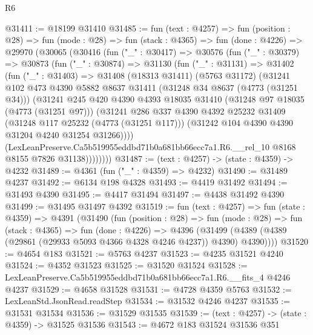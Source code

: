 \begin{lexlean}{R6}
\begin{coremodule}
@31411 := @18199 @31410
@31485 := fun (text : @4257) =>
  fun (position : @28) =>
  fun (mode : @28) =>
  fun (stack : @4365) =>
  fun (done : @4226) =>
  @29970
    (@30065
      (@30416
        (fun ("_" : @30417) =>
        @30576
          (fun ("_" : @30379) =>
          @30873
            (fun ("_" : @30874) =>
            @31130
              (fun ("_" : @31131) =>
              @31402
                (fun ("_" : @31403) =>
                @31408
                  (@18313 @31411)
                  (@5763 @31172)
                  (@31241
                    @102
                    @473
                    @4390
                    @5882
                    @8637
                    @31411
                    (@31248 @34 @8637 (@4773 (@31251 @34)))
                    (@31241
                      @245
                      @420
                      @4390
                      @4393
                      @18035
                      @31410
                      (@31248 @97 @18035 (@4773 (@31251 @97)))
                      (@31241
                        @286
                        @337
                        @4390
                        @4392
                        @25232
                        @31409
                        (@31248 @117 @25232 (@4773 (@31251 @117)))
                        (@31242 @104 @4390 @4390 @31204 @4240 @31254 @31266))))
                  (LexLeanPreserve.Ca5b519955eddbd71b0a681bb66ecc7a1.R6.__rel_10
                    @8168
                    @8155
                    @7826
                    @31138))))))))
@31487 := (text : @4257) -> (state : @4359) -> @4232
@31489 := @4361 (fun ("_" : @4359) => @4232)
@31490 := @31489 @4237
@31492 := @6134 @198 @4328
@31493 := @4419 @31492
@31494 := @31493 @4390
@31495 := @4417 @31494
@31497 := @4438 @31492 @4390
@31499 := @31495 @31497 @4392
@31519 := fun (text : @4257) =>
  fun (state : @4359) =>
  @4391
    (@31490
      (fun (position : @28) =>
      fun (mode : @28) =>
      fun (stack : @4365) =>
      fun (done : @4226) =>
      @4396 (@31499 (@4389 (@4389 (@29861 (@29933 @5093 @4366 @4328 @4246 @4237)) @4390) @4390))))
@31520 := @4654 @183
@31521 := @5763 @4237
@31523 := @4235 @31521 @4240
@31524 := @4352 @31523
@31525 := @31520 @31524
@31528 := LexLeanPreserve.Ca5b519955eddbd71b0a681bb66ecc7a1.R6.__fits_4 @4246 @4237
@31529 := @4658 @31528
@31531 := @4728 @4359 @5763
@31532 := LexLeanStd.JsonRead.readStep
@31534 := @31532 @4246 @4237
@31535 := @31531 @31534
@31536 := @31529 @31535
@31539 := (text : @4257) -> (state : @4359) -> @31525 @31536
@31543 := @4672 @183 @31524 @31536 @351

\end{coremodule}
\end{lexlean}
